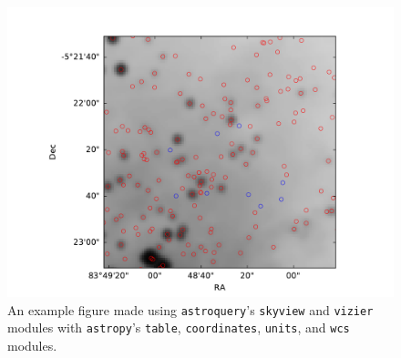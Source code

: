 \documentclass[twocolumn]{aastex61}
\newcommand{\package}[1]{\texttt{#1}\xspace}
\newcommand{\astroquery}{\package{astroquery}}
\newcommand{\astropypkg}{\package{astropy}}
\begin{document}
\begin{figure}[!htp]
\includegraphics[scale=1,width=7in]{example_figure_1.pdf}
\caption{An example figure made using \astroquery's \texttt{skyview} and
\texttt{vizier} modules with \astropypkg's \texttt{table}, \texttt{coordinates},
\texttt{units}, and \texttt{wcs} modules.}
\label{fig:example1}
\end{figure}
\end{document}
